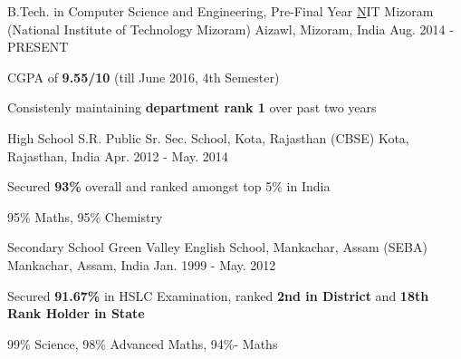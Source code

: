 \begin{cventries}
  \cventry
    {B.Tech. in Computer Science and Engineering, Pre-Final Year}
    {\href{http://nitmz.ac.in/}NIT Mizoram (National Institute of Technology Mizoram)}
    {Aizawl, Mizoram, India}
    {Aug. 2014 - PRESENT}
    {
      \begin{cvitems}
        \item {CGPA of \textbf{9.55/10} (till June 2016, 4th Semester)}
        \item {Consistenly maintaining \textbf{department rank 1} over past two years}
      \end{cvitems}
    }
\cventry
    {High School}
    {S.R. Public Sr. Sec. School, Kota, Rajasthan (CBSE)}
    {Kota, Rajasthan, India}
    {Apr. 2012 - May. 2014}
    {
      \begin{cvitems}
        \item {Secured \textbf{93\%} overall and ranked amongst top 5\% in India }
        \item {95\% Maths, 95\% Chemistry }
      \end{cvitems}
    }
 \cventry
    {Secondary School}
    {Green Valley English School, Mankachar, Assam (SEBA)}
    {Mankachar, Assam, India}
    {Jan. 1999 - May. 2012}
    {
      \begin{cvitems}
        \item {Secured \textbf{91.67\%} in HSLC Examination, ranked \textbf{2nd in District} and \textbf{18th Rank Holder in State}}
        \item {99\% Science,  98\% Advanced Maths,  94\%- Maths}
      \end{cvitems}
    }
\end{cventries}
